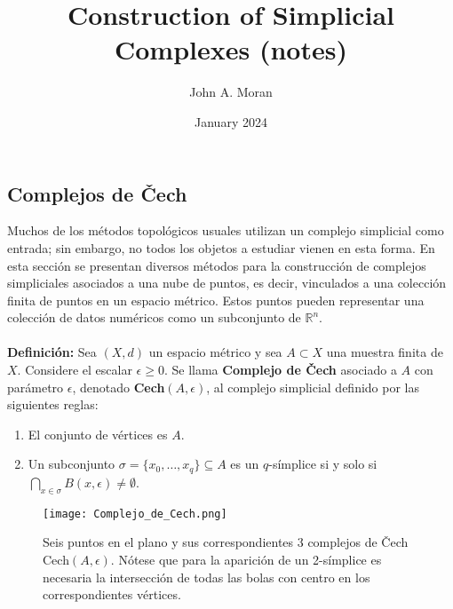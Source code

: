 \documentclass{article}
\title{Construction of Simplicial Complexes (notes)}
\author
{John A. Moran }
\date{January 2024}
\begin{document}
\maketitle

\tableofcontents






\subsection{Complejos de Čech}

Muchos de los métodos topológicos usuales utilizan un complejo simplicial como entrada; sin embargo, no todos los objetos a estudiar vienen en esta forma. En esta sección se presentan diversos métodos para la construcción de complejos simpliciales asociados a una nube de puntos, es decir, vinculados a una colección finita de puntos en un espacio métrico. Estos puntos pueden representar una colección de datos numéricos como un subconjunto de $\mathbb{R}^n$.\\
\\
\textbf{Definición:} Sea $(X, d)$ un espacio métrico y sea $A \subset X$ una muestra finita de $X$. Considere el escalar $\epsilon \geq 0$. Se llama \textbf{Complejo de Čech} asociado a $A$ con parámetro $\epsilon$, denotado \textbf{Cech$(A, \epsilon)$}, al complejo simplicial definido por las siguientes reglas:
\begin{enumerate}
    \item El conjunto de vértices es $A$.
    \item Un subconjunto $\sigma = \{x_{0}, \ldots, x_{q}\} \subseteq A$ es un $q$-símplice si y solo si $\bigcap_{x \in \sigma} B(x, \epsilon) \neq \emptyset$.
\end{enumerate}
\begin{figure}[h]
  \centering
  \texttt{[image: Complejo\_de\_Cech.png]}
  \caption{Seis puntos en el plano y sus correspondientes 3 complejos de Čech Cech$(A, \epsilon)$. Nótese que para la aparición de un 2-símplice es necesaria la intersección de todas las bolas con centro en los correspondientes vértices.}
  \label{fig:mi_imagen}
\end{figure}
\end{document}
